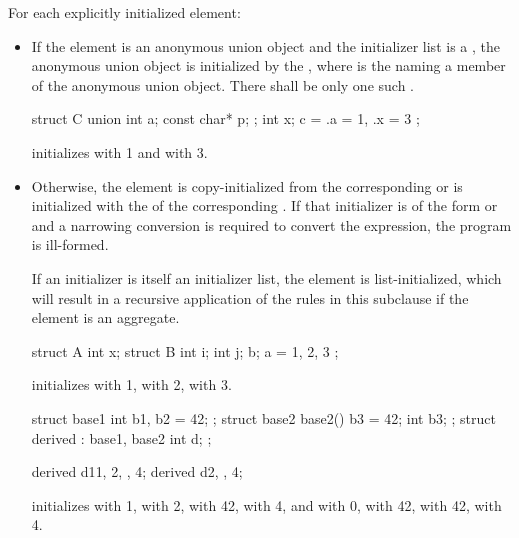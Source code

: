 \pnum
For each explicitly initialized element:
\begin{itemize}
\item
If the element is an anonymous union object and
the initializer list is a ,
the anonymous union object is initialized by the
 \tcode{\{ }\tcode{ \}},
where  is the 
naming a member of the anonymous union object.
There shall be only one such .
\begin{example}
\begin{codeblock}
struct C {
  union {
    int a;
    const char* p;
  };
  int x;
} c = { .a = 1, .x = 3 };
\end{codeblock}
initializes  with 1 and  with 3.
\end{example}
\item
Otherwise, the element is copy-initialized
from the corresponding 
or is initialized with the 
of the corresponding .
If that initializer is of the form
 or
\tcode{= }
and
a narrowing conversion is required
to convert the expression, the program is ill-formed.
\begin{note}
If an initializer is itself an initializer list,
the element is list-initialized, which will result in a recursive application
of the rules in this subclause if the element is an aggregate.
\end{note}
\begin{example}
\begin{codeblock}
struct A {
  int x;
  struct B {
    int i;
    int j;
  } b;
} a = { 1, { 2, 3 } };
\end{codeblock}
initializes
with 1,
with 2,
with 3.

\begin{codeblock}
struct base1 { int b1, b2 = 42; };
struct base2 {
  base2() {
    b3 = 42;
  }
  int b3;
};
struct derived : base1, base2 {
  int d;
};

derived d1{{1, 2}, {}, 4};
derived d2{{}, {}, 4};
\end{codeblock}
initializes
 with 1,
 with 2,
 with 42,
 with 4, and
 with 0,
 with 42,
 with 42,
 with 4.
\end{example}
\end{itemize}


